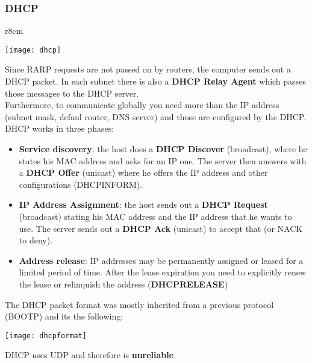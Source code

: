 \subsubsection{DHCP}
\begin{wrapfigure}[10]{r}{8cm}
	\vspace{-1.5cm}
	\begin{center}
		\texttt{[image: dhcp]}
	\end{center}
\end{wrapfigure}
Since RARP requests are not passed on by routers, the computer sends out a DHCP packet. In each subnet there is also a \textbf{DHCP Relay Agent} which passes those messages to the DHCP server.\\
Furthermore, to communicate globally you need more than the IP address (subnet mask, defaul router, DNS server) and those are configured by the DHCP.\\
DHCP works in three phases:
\begin{itemize}
	\item \textbf{Service discovery}: the host does a \textbf{DHCP Discover} (broadcast), where he states his MAC address and asks for an IP one. The server then answers with a \textbf{DHCP Offer} (unicast) where he offers the IP address and other configurations (DHCPINFORM).
	\item \textbf{IP Address Assignment}: the host sends out a \textbf{DHCP Request} (broadcast) stating his MAC address and the IP address that he wants to use. The server sends out a \textbf{DHCP Ack} (unicast) to accept that (or NACK to deny).
	\item \textbf{Address release}: IP addresses may be permanently assigned or leased for a limited period of time. After the lease expiration you need to explicitly renew the lease or relinquish the address (\textbf{DHCPRELEASE})
\end{itemize}

The DHCP packet format was mostly inherited from a previous protocol (BOOTP) and its the following:
\begin{center}
	\texttt{[image: dhcpformat]}
\end{center}

\begin{note}
	DHCP uses UDP and therefore is \textbf{unreliable}.
\end{note}

